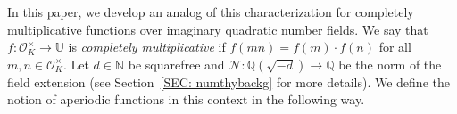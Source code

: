\documentclass[11pt]{amsart}
\theoremstyle{definition}
\DeclareMathOperator*{\E}{\mathbb{E}}
\newcommand{\N}{{\mathbb N}}
\newcommand{\NN}{{\mathcal N}}
\newcommand{\Q}{{\mathbb Q}}
\newcommand{\Z}{{\mathbb Z}}
\newcommand{\U}{{\mathbb U}}
\begin{document}
In this paper, we develop an analog of this characterization for completely multiplicative functions over imaginary quadratic number fields.
  We say that $f\colon \mathcal{O}_K^{\times}\to\U$ is \emph{completely multiplicative} if $f(mn)=f(m)\cdot f(n)$ for all $m,n\in \mathcal{O}_K^{\times}$. Let $d\in\N$ be squarefree and $\NN\colon \Q(\sqrt{-d})\to \Q$ be the norm of the field extension (see Section~\ref{SEC: numthybackg} for more details). %
We define the notion of aperiodic functions in this context in the following way.
\end{document}
